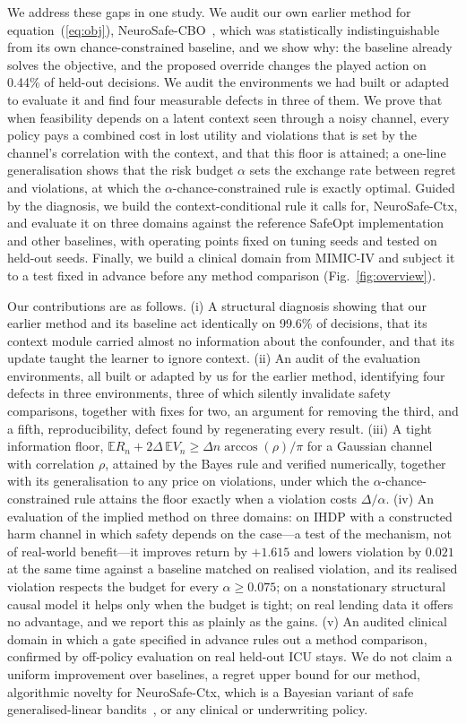\documentclass[10pt,a4paper]{article}
\begin{document}
We address these gaps in one study. We audit our own earlier method for equation~(\ref{eq:obj}), NeuroSafe-CBO~\cite{neurosafecbo}, which was statistically indistinguishable from its own chance-constrained baseline, and
we show why: the baseline already solves the objective, and the proposed override changes the
played action on 0.44\% of held-out decisions. We audit the environments we had built or adapted to evaluate it and find four measurable defects in three of them. We prove that when feasibility depends on a latent context seen
through a noisy channel, every policy pays a combined cost in lost utility and violations that is set
by the channel's correlation with the context, and that this floor is attained; a one-line generalisation shows that the risk budget $\alpha$ sets the exchange rate between regret and violations, at which the $\alpha$-chance-constrained rule is exactly optimal. Guided by the
diagnosis, we build the context-conditional rule it calls for, NeuroSafe-Ctx, and evaluate it on three
domains against the reference SafeOpt implementation and other baselines, with operating points fixed
on tuning seeds and tested on held-out seeds. Finally, we build a clinical domain from MIMIC-IV and
subject it to a test fixed in advance before any method comparison (Fig.~\ref{fig:overview}).

Our contributions are as follows. (i) A structural diagnosis showing that our earlier method and its baseline act identically on 99.6\% of decisions, that its context module carried almost no
information about the confounder, and that its update taught the learner to ignore context.
(ii) An audit of the evaluation environments, all built or adapted by us for the earlier method, identifying four defects in three environments, three of which silently invalidate safety comparisons, together with fixes for two, an argument for removing the third, and a fifth,
reproducibility, defect found by regenerating every result. (iii) A tight information floor,
$\mathbb E R_n+2\Delta\,\mathbb E V_n\ge\Delta n\arccos(\rho)/\pi$ for a Gaussian channel with
correlation $\rho$, attained by the Bayes rule and verified numerically, together with its generalisation to any price on violations, under which the $\alpha$-chance-constrained rule attains the floor exactly when a violation costs $\Delta/\alpha$. (iv) An evaluation of the
implied method on three domains: on IHDP with a constructed harm channel in which safety depends on the case---a test of the mechanism, not of real-world benefit---it improves return by $+1.615$ and lowers violation by $0.021$ at the same time against a baseline matched on realised violation, and its realised violation respects the budget for every $\alpha\ge0.075$; on a nonstationary structural causal model
it helps only when the budget is tight; on real lending data it offers no advantage, and we report
this as plainly as the gains. (v) An audited clinical domain in which a gate specified in advance rules out
a method comparison, confirmed by off-policy evaluation on real held-out ICU stays. We do not claim a
uniform improvement over baselines, a regret upper bound for our method, algorithmic novelty for NeuroSafe-Ctx, which is a Bayesian variant of safe generalised-linear bandits~\cite{amani2020glm}, or any clinical or underwriting policy.
\end{document}
